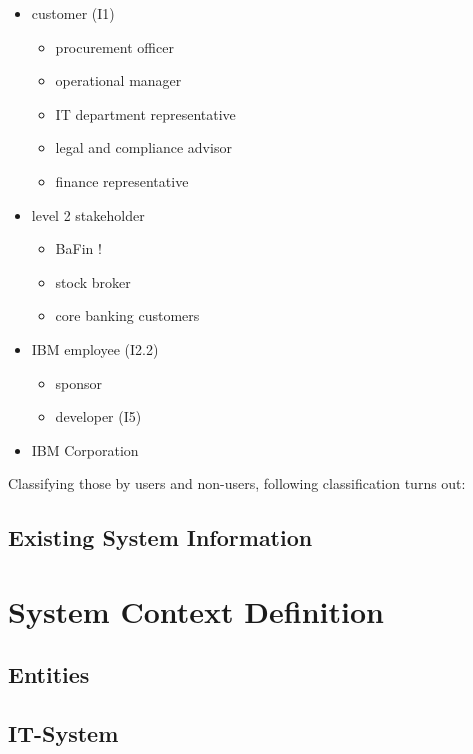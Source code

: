 \begin{multicols}{2}
\begin{itemize}
    \item customer (I1)
    \begin{itemize}
        \item procurement officer
        \item operational manager
        \item IT department representative
        \item legal and compliance advisor
        \item finance representative
    \end{itemize} \columnbreak
    \item level 2 stakeholder
    \begin{itemize}
        \item BaFin !
        \item stock broker
        \item core banking customers
    \end{itemize}
    \item IBM employee (I2.2)
    \begin{itemize}
        \item sponsor
        \item developer (I5)
    \end{itemize}
    \item IBM Corporation
\end{itemize}
\end{multicols}

Classifying those by users and non-users, following classification turns out:


\subsection{Existing System Information}


\section{System Context Definition}
\subsection{Entities}

\subsection{IT-System}

